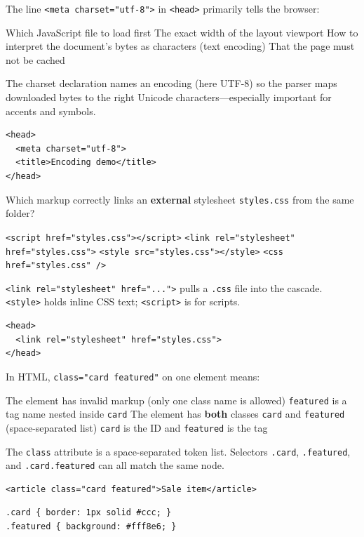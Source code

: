 \question[4]
The line \texttt{<meta charset="utf-8">} in \texttt{<head>} primarily tells the browser:
\begin{choices}
  \choice Which JavaScript file to load first
  \choice The exact width of the layout viewport
  \CorrectChoice How to interpret the document's bytes as characters (text encoding)
  \choice That the page must not be cached
\end{choices}
\begin{solution}
  The charset declaration names an encoding (here UTF-8) so the parser maps downloaded bytes to the right Unicode characters---especially important for accents and symbols.
\begin{lstlisting}[style=htmlexam]
<head>
  <meta charset="utf-8">
  <title>Encoding demo</title>
</head>
\end{lstlisting}
\end{solution}

\question[4]
Which markup correctly links an \textbf{external} stylesheet \texttt{styles.css} from the same folder?
\begin{choices}
  \choice \texttt{<script href="styles.css"></script>}
  \CorrectChoice \texttt{<link rel="stylesheet" href="styles.css">}
  \choice \texttt{<style src="styles.css"></style>}
  \choice \texttt{<css href="styles.css" />}
\end{choices}
\begin{solution}
  \texttt{<link rel="stylesheet" href="...">} pulls a \texttt{.css} file into the cascade. \texttt{<style>} holds inline CSS text; \texttt{<script>} is for scripts.
\begin{lstlisting}[style=htmlexam]
<head>
  <link rel="stylesheet" href="styles.css">
</head>
\end{lstlisting}
\end{solution}

\newpage

\question[4]
In HTML, \texttt{class="card featured"} on one element means:
\begin{choices}
  \choice The element has invalid markup (only one class name is allowed)
  \choice \texttt{featured} is a tag name nested inside \texttt{card}
  \CorrectChoice The element has \textbf{both} classes \texttt{card} and \texttt{featured} (space-separated list)
  \choice \texttt{card} is the ID and \texttt{featured} is the tag
\end{choices}
\begin{solution}
  The \texttt{class} attribute is a space-separated token list. Selectors \texttt{.card}, \texttt{.featured}, and \texttt{.card.featured} can all match the same node.
\begin{lstlisting}[style=htmlexam]
<article class="card featured">Sale item</article>
\end{lstlisting}
\begin{lstlisting}[style=cssexam]
.card { border: 1px solid #ccc; }
.featured { background: #fff8e6; }
\end{lstlisting}
\end{solution}

